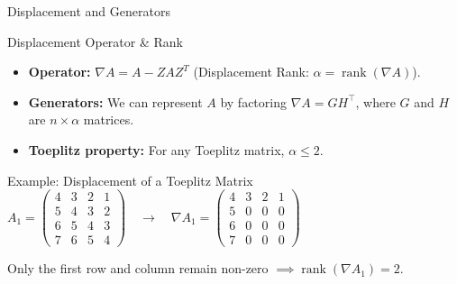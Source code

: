 \begin{frame}{Displacement and Generators}

  \begin{block}{Displacement Operator \& Rank}
    \begin{itemize}
      \item \textbf{Operator:} $\nabla A = A - Z A Z^T$ \quad
        (Displacement Rank: $\alpha = \operatorname{rank}(\nabla A)$).
      \item \textbf{Generators:} We can represent $A$ by factoring
        $\nabla A = G H^\top$, where $G$ and $H$ are $n \times \alpha$ matrices.
      \item \textbf{Toeplitz property:} For any Toeplitz matrix,
        $\alpha \leq 2$.
    \end{itemize}
  \end{block}

  \begin{block}{Example: Displacement of a Toeplitz Matrix}
    \centering \small
    $A_{1} =
    \begin{pmatrix}
      4 & 3 & 2 & 1 \\
      5 & 4 & 3 & 2 \\
      6 & 5 & 4 & 3 \\
      7 & 6 & 5 & 4
    \end{pmatrix}
    \quad \longrightarrow \quad
    \nabla A_{1} =
    \begin{pmatrix}
      4 & 3 & 2 & 1 \\
      5 & 0 & 0 & 0 \\
      6 & 0 & 0 & 0 \\
      7 & 0 & 0 & 0
    \end{pmatrix}$

    \vspace{0.5em}
    Only the first row and column remain non-zero $\implies
    \operatorname{rank}(\nabla A_1) = 2$.
  \end{block}

\end{frame}
